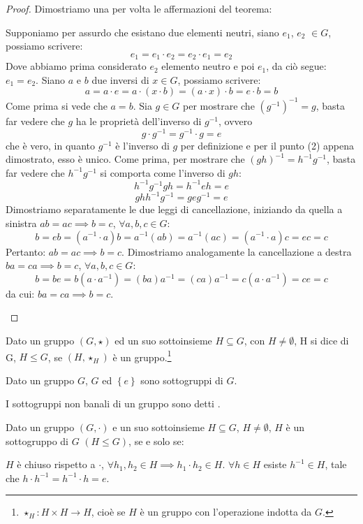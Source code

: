 \documentclass[11pt]{scrartcl}
\begin{document}
\begin{proof}
	Dimostriamo una per volta le affermazioni del teorema:
	\begin{enumerate}[(1)]
		\ii Supponiamo per assurdo che esistano due elementi neutri, siano $e_1$, $e_2$ $\in G$, possiamo scrivere:
			\[ e_1
			=
			e_1 \cdot e_2
			=
			e_2 \cdot e_1
			=
			e_2
			\]
		Dove abbiamo prima considerato $e_2$ elemento neutro e poi $e_1$, da ciò segue: $e_1 = e_2$.
		\ii Siano $a$ e $b$ due inversi di $x \in G$, possiamo scrivere:
			\[a
			=
			a \cdot e
			=
			a \cdot (x \cdot b)
			=
			(a \cdot x) \cdot b
			=
			e \cdot b
			=b
			\]
		Come prima si vede che $a = b$.
		\ii Sia $g \in G$ per mostrare che $(g^{-1})^{-1}=g$, basta far vedere che $g$ ha le proprietà dell'inverso di $g^{-1}$, ovvero
			\[ g \cdot g^{-1}
			=
			g^{-1} \cdot g
			=
			e
			\]
			che è vero, in quanto $g^{-1}$ è l'inverso di $g$ per definizione e per il punto (2) appena dimostrato, esso è unico.
		\ii Come prima, per mostrare che $(gh)^{-1}=h^{-1}g^{-1}$, basta far vedere che $h^{-1}g^{-1}$ si comporta come l'inverso di $gh$:
			\[h^{-1}g^{-1}gh
			=
			h^{-1}eh
			=
			e 
			\]
			\[
			ghh^{-1}g^{-1}
			=
			geg^{-1}
			=
			e
			\]
		\ii Dimostriamo separatamente le due leggi di cancellazione, iniziando da quella a sinistra $ab=ac \implies b=c$,  $\forall a,b,c \in G$:
			\[ b
			=
			eb
			=
			(a^{-1} \cdot a)b
			=
			a^{-1}(ab)
			=
			a^{-1}(ac)
			=
			(a^{-1} \cdot a)c
			=
			ec
			=
			c 
			\]
			Pertanto:  $ab=ac \implies b=c$. Dimostriamo analogamente la cancellazione a destra $ba=ca \implies b=c$,  $\forall a,b,c \in G$:
			\[b
			=
			be
			=
			b(a \cdot a^{-1})
			=
			(ba)a^{-1}
			=
			(ca)a^{-1}
			=
			c(a \cdot a^{-1})
			=
			ce
			=
			c
			\]
			da cui: $ba=ca \implies b=c$.
	\end{enumerate}
\end{proof}

\begin{definition}
Dato un gruppo $(G, \star)$ ed un suo sottoinsieme $H \subseteq G$, con $H \neq \emptyset$, H si dice  di G, $H \leqslant G$, se $(H, \star_{H})$ è un gruppo.\footnote{$\star_{H}: H \times H \longrightarrow H$, cioè se $H$ è un gruppo con l'operazione indotta da $G$.}
\end{definition}

\begin{example}
Dato un gruppo $G$, $G$ ed $\left \{e\right \}$ sono sottogruppi di $G$. 
\end{example}
I sottogruppi non banali di un gruppo sono detti .
\begin{theorem}
\label{g:sgr}
Dato un gruppo $(G, \cdot)$ e un suo sottoinsieme $H \subseteq G$, $H \neq \emptyset$, $H$ è un sottogruppo di $G$ $(H \leqslant G)$, se e solo se:
	\begin{enumerate}[(1)]
		\ii $H$ è chiuso rispetto a $\cdot$, $\forall h_1,h_2 \in H \implies h_1 \cdot h_2 \in H$.
		\ii $\forall h \in H$ esiste $h^{-1} \in H$, tale che $h \cdot h^{-1}=h^{-1} \cdot h=e$.
	\end{enumerate}
\end{theorem}
\end{document}
